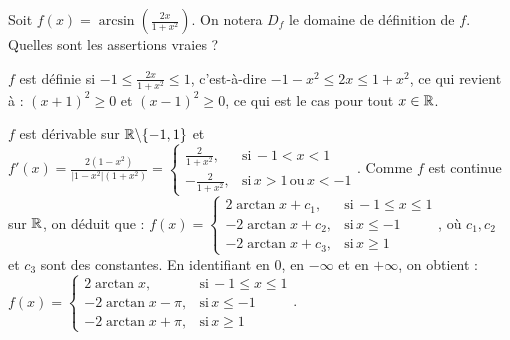 \begin{question} 

Soit $f(x)= \arcsin (\frac{2x}{1+x^2})$. On notera $D_f$ le domaine de définition de $f$. Quelles sont les assertions vraies ?
\begin{answers}
    



  
\end{answers}
\begin{explanations}
$f$ est définie si $-1\le \frac{2x}{1+x^2} \le 1 $, c'est-à-dire $-1-x^2 \le 2x \le 1+x^2$, ce qui revient à : $(x+1)^2\ge 0$ et $(x-1)^2\ge 0$, ce qui est le cas pour tout $x \in \mathbb{R}$.

$f$ est dérivable sur $\mathbb{R} \backslash \{-1,1\}$ et 
$f'(x) = \frac{2(1-x^2)}{|1-x^2|(1+x^2)} = \left\{\begin{array}{cc}\frac{2}{1+x^2},& \mbox{si} \, -1 < x < 1 \\ -\frac{2}{1+x^2},& \mbox{si} \, x > 1 \, \mbox{ou} \, x < -1 \end{array}\right. $. Comme $f$ est continue sur $\mathbb{R}$, on déduit que : 
$f(x)= \left\{\begin{array}{ccc}2\arctan x + c_1, & \mbox{si} \, -1\le x\le 1 \\ -2\arctan x + c_2, & \mbox{si} \, x\le -1 \\ -2\arctan x + c_3, & \mbox{si} \, x\ge 1 \end{array}\right.$, où $c_1, c_2$ et $c_3$ sont des constantes.
En identifiant en $0$, en $-\infty$ et en $+\infty$, on obtient : 
$f(x)= \left\{\begin{array}{ccc}2\arctan x, & \mbox{si} \, -1\le x\le 1 \\ -2\arctan x -\pi, & \mbox{si} \, x\le -1 \\ -2\arctan x +\pi, & \mbox{si} \, x\ge 1 \end{array}\right.$.
\end{explanations}

\end{question}


